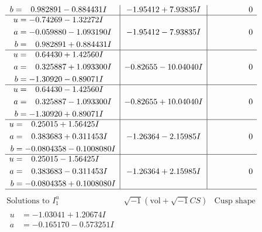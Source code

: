 \documentclass[1p]{elsarticle_modified}
\theoremstyle{definition}
\newcommand{\I}{\sqrt{-1}}
\begin{document}
$$\begin{array}{c|c|c}
\begin{aligned}
b &= \phantom{-}0.982891 - 0.884431 I\end{aligned}
 & -1.95412 + 7.93835 I & \phantom{-0.000000 } 0 \\ \hline\begin{aligned}
u &= -0.74269 - 1.32272 I \\
a &= -0.059880 - 1.093190 I \\
b &= \phantom{-}0.982891 + 0.884431 I\end{aligned}
 & -1.95412 - 7.93835 I & \phantom{-0.000000 } 0 \\ \hline\begin{aligned}
u &= \phantom{-}0.64430 + 1.42560 I \\
a &= \phantom{-}0.325887 + 1.093300 I \\
b &= -1.30920 - 0.89071 I\end{aligned}
 & -0.82655 - 10.04040 I & \phantom{-0.000000 } 0 \\ \hline\begin{aligned}
u &= \phantom{-}0.64430 - 1.42560 I \\
a &= \phantom{-}0.325887 - 1.093300 I \\
b &= -1.30920 + 0.89071 I\end{aligned}
 & -0.82655 + 10.04040 I & \phantom{-0.000000 } 0 \\ \hline\begin{aligned}
u &= \phantom{-}0.25015 + 1.56425 I \\
a &= \phantom{-}0.383683 + 0.311453 I \\
b &= -0.0804358 - 0.1008080 I\end{aligned}
 & -1.26364 - 2.15985 I & \phantom{-0.000000 } 0 \\ \hline\begin{aligned}
u &= \phantom{-}0.25015 - 1.56425 I \\
a &= \phantom{-}0.383683 - 0.311453 I \\
b &= -0.0804358 + 0.1008080 I\end{aligned}
 & -1.26364 + 2.15985 I & \phantom{-0.000000 } 0\\
 \hline 
 \end{array}$$\newpage$$\begin{array}{c|c|c}  
\text{Solutions to }I^u_{1}& \I (\text{vol} + \sqrt{-1}CS) & \text{Cusp shape}\\
 \hline 
\begin{aligned}
u &= -1.03041 + 1.20674 I \\
a &= -0.165170 - 0.573251 I \\

\end{aligned}
\end{array}$$
\end{document}
